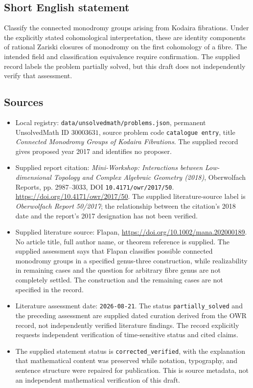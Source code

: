 \documentclass[11pt]{article}
\begin{document}
\subsection{Short English statement}
Classify the connected monodromy groups arising from Kodaira fibrations. Under the explicitly stated cohomological interpretation, these are identity components of rational Zariski closures of monodromy on the first cohomology of a fibre. The intended field and classification equivalence require confirmation. The supplied record labels the problem partially solved, but this draft does not independently verify that assessment.
\subsection{Sources}
\begin{itemize}
\item Local registry: \texttt{data/unsolvedmath/problems.json}, permanent UnsolvedMath ID \(30003631\), source problem code \texttt{catalogue entry}, title \emph{Connected Monodromy Groups of Kodaira Fibrations}. The supplied record gives proposed year 2017 and identifies no proposer.
\item Supplied report citation: \emph{Mini-Workshop: Interactions between Low-dimensional Topology and Complex Algebraic Geometry (2018)}, Oberwolfach Reports, pp. 2987--3033, DOI \texttt{10.4171/owr/2017/50}. \url{https://doi.org/10.4171/owr/2017/50}. The supplied literature-source label is \emph{Oberwolfach Report 50/2017}; the relationship between the citation's 2018 date and the report's 2017 designation has not been verified.
\item Supplied literature source: Flapan, \url{https://doi.org/10.1002/mana.202000189}. No article title, full author name, or theorem reference is supplied. The supplied assessment says that Flapan classifies possible connected monodromy groups in a specified genus-three construction, while realizability in remaining cases and the question for arbitrary fibre genus are not completely settled. The construction and the remaining cases are not specified in the record.
\item Literature assessment date: \texttt{2026-08-21}. The status \texttt{partially\_solved} and the preceding assessment are supplied dated curation derived from the OWR record, not independently verified literature findings. The record explicitly requests independent verification of time-sensitive status and cited claims.
\item The supplied statement status is \texttt{corrected\_verified}, with the explanation that mathematical content was preserved while notation, typography, and sentence structure were repaired for publication. This is source metadata, not an independent mathematical verification of this draft.
\end{itemize}
\end{document}
